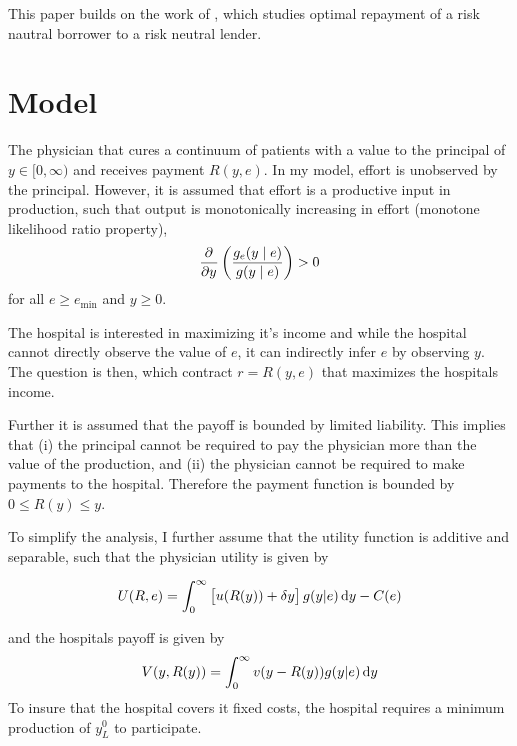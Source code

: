 This paper builds on the work of \textcite{Innes1990Limited}, which studies optimal repayment of a risk nautral borrower to a risk neutral lender.

\section{Model} %
\label{sec:model}
The physician that cures a continuum of patients with a value to the principal of $y\in[0,\infty)$ and receives payment $R(y,e)$.  In my model, effort is unobserved by the principal. However, it is assumed that effort is a productive input in production, such that output is monotonically increasing in effort (monotone likelihood ratio property),
\begin{align}
    \pder{y}\left(\frac{g_e(y\mid e)}{g(y\mid e)}\right)>0 \label{eq:mlrp}
\end{align}
for all $e\geq e_{\min}$ and $y\geq 0$. 

The hospital is interested in maximizing it's income and while the hospital cannot directly observe the value of $e$, it can indirectly infer $e$ by observing $y$. The question is then, which contract $r=R(y,e)$ that maximizes the hospitals income.  

Further it is assumed that the payoff is bounded by limited liability. This implies that (i) the principal cannot be required to pay the physician more than the value of the production, and (ii) the physician cannot be required to make payments to the hospital.  Therefore the payment function is bounded by $0\leq R(y)\leq y$.

To simplify the analysis, I further assume that the utility function is additive and separable, such that the physician utility is given by 

\begin{align}
    U(R,e)=\int_0^\infty \left[u(R(y))+\delta y\right]g(y|e)\dif y-C(e) \label{eq:utility}
\end{align}

and the hospitals payoff is given by 
\begin{align}
    V(y,R(y))=\int_0^\infty v(y-R(y))g(y|e)\dif y
\end{align}
To insure that the hospital covers it fixed costs, the hospital requires a minimum production of $y_L^0$ to participate. 

